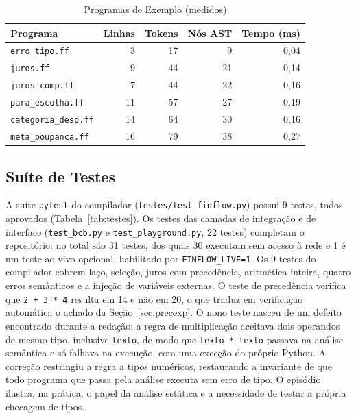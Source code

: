 \documentclass[conference]{IEEEtran}
\begin{document}
\begin{table}[!htbp]
\caption{Programas de Exemplo (medidos)}
\label{tab:exemplos}
\centering
\footnotesize
\setlength{\tabcolsep}{3pt}\begin{tabular}{@{}lrrrr@{}}
\toprule
\textbf{Programa} & \textbf{Linhas} & \textbf{Tokens} & \textbf{Nós AST} & \textbf{Tempo (ms)} \\
\midrule
\texttt{erro\_tipo.ff} & 3 & 17 & 9 & 0,04 \\
\texttt{juros.ff} & 9 & 44 & 21 & 0,14 \\
\texttt{juros\_comp.ff} & 7 & 44 & 22 & 0,16 \\
\texttt{para\_escolha.ff} & 11 & 57 & 27 & 0,19 \\
\texttt{categoria\_desp.ff} & 14 & 64 & 30 & 0,16 \\
\texttt{meta\_poupanca.ff} & 16 & 79 & 38 & 0,27 \\
\bottomrule
\end{tabular}
\end{table}

\subsection{Suíte de Testes}

A suíte \texttt{pytest} do compilador (\texttt{testes/test\_finflow.py}) possui 9 testes, todos aprovados (Tabela~\ref{tab:testes}). Os testes das camadas de integração e de interface (\texttt{test\_bcb.py} e \texttt{test\_playground.py}, 22 testes) completam o repositório: no total são 31 testes, dos quais 30 executam sem acesso à rede e 1 é um teste ao vivo opcional, habilitado por \texttt{FINFLOW\_LIVE=1}. Os 9 testes do compilador cobrem laço, seleção, juros com precedência, aritmética inteira, quatro erros semânticos e a injeção de variáveis externas. O teste de precedência verifica que \texttt{2 + 3 * 4} resulta em 14 e não em 20, o que traduz em verificação automática o achado da Seção~\ref{sec:precexp}. O nono teste nasceu de um defeito encontrado durante a redação: a regra de multiplicação aceitava dois operandos de mesmo tipo, inclusive \texttt{texto}, de modo que \texttt{texto * texto} passava na análise semântica e só falhava na execução, com uma exceção do próprio Python. A correção restringiu a regra a tipos numéricos, restaurando a invariante de que todo programa que passa pela análise executa sem erro de tipo. O episódio ilustra, na prática, o papel da análise estática e a necessidade de testar a própria checagem de tipos.
\end{document}
